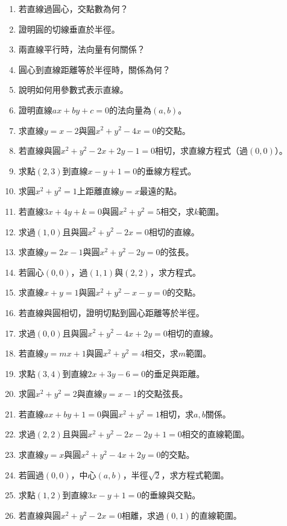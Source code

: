 \begin{enumerate}[label=\arabic*.]
    \item 若直線過圓心，交點數為何？
    \item 證明圓的切線垂直於半徑。
    \item 兩直線平行時，法向量有何關係？
    \item 圓心到直線距離等於半徑時，關係為何？
    \item 說明如何用參數式表示直線。
    \item 證明直線$ax + by + c = 0$的法向量為$(a, b)$。
    \item 求直線$y = x - 2$與圓$x^2 + y^2 - 4x = 0$的交點。
    \item 若直線與圓$x^2 + y^2 - 2x + 2y - 1 = 0$相切，求直線方程式（過$(0, 0)$）。
    \item 求點$(2, 3)$到直線$x - y + 1 = 0$的垂線方程式。
    \item 求圓$x^2 + y^2 = 1$上距離直線$y = x$最遠的點。
    \item 若直線$3x + 4y + k = 0$與圓$x^2 + y^2 = 5$相交，求$k$範圍。
    \item 求過$(1, 0)$且與圓$x^2 + y^2 - 2x = 0$相切的直線。
    \item 求直線$y = 2x - 1$與圓$x^2 + y^2 - 2y = 0$的弦長。
    \item 若圓心$(0, 0)$，過$(1, 1)$與$(2, 2)$，求方程式。
    \item 求直線$x + y = 1$與圓$x^2 + y^2 - x - y = 0$的交點。
    \item 若直線與圓相切，證明切點到圓心距離等於半徑。
    \item 求過$(0, 0)$且與圓$x^2 + y^2 - 4x + 2y = 0$相切的直線。
    \item 若直線$y = mx + 1$與圓$x^2 + y^2 = 4$相交，求$m$範圍。
    \item 求點$(3, 4)$到直線$2x + 3y - 6 = 0$的垂足與距離。
    \item 求圓$x^2 + y^2 = 2$與直線$y = x - 1$的交點弦長。
    \item 若直線$ax + by + 1 = 0$與圓$x^2 + y^2 = 1$相切，求$a, b$關係。
    \item 求過$(2, 2)$且與圓$x^2 + y^2 - 2x - 2y + 1 = 0$相交的直線範圍。
    \item 求直線$y = x$與圓$x^2 + y^2 - 4x + 2y = 0$的交點。
    \item 若圓過$(0, 0)$，中心$(a, b)$，半徑$\sqrt{2}$，求方程式範圍。
    \item 求點$(1, 2)$到直線$3x - y + 1 = 0$的垂線與交點。
    \item 若直線與圓$x^2 + y^2 - 2x = 0$相離，求過$(0, 1)$的直線範圍。

\end{enumerate}
